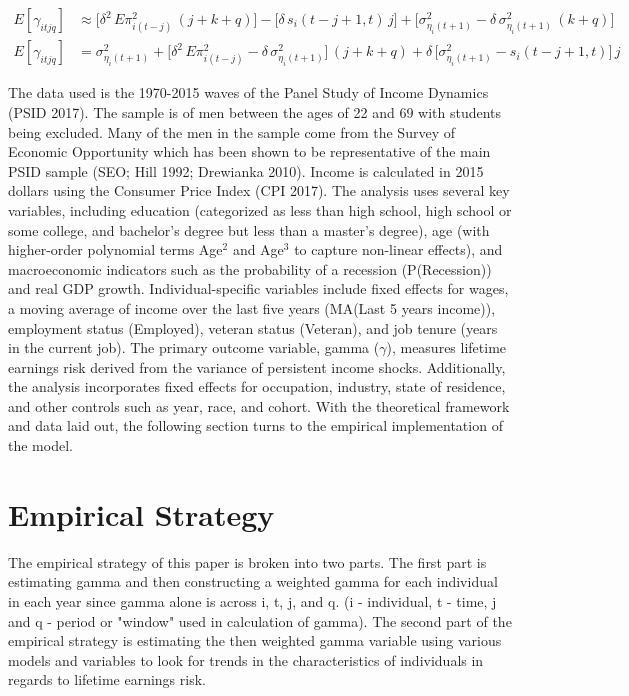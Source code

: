 \documentclass[12pt]{article}
\begin{document}
\begin{onehalfspace}
\vspace{-0.75cm}

\begin{align}
E[\gamma_{itjq}]
&\approx
\bigl[\delta^2\,E\pi^2_{i(t-j)}\,(j+k+q)\bigr]
- \bigl[\delta\,s_i(t-j+1,t)\,j\bigr]
+ \bigl[\sigma^2_{\eta_i(t+1)}
  - \delta\,\sigma^2_{\eta_i(t+1)}\,(k+q)\bigr] \\[1ex]
E[\gamma_{itjq}]
&=
\sigma^2_{\eta_i(t+1)}
+ \bigl[\delta^2\,E\pi^2_{i(t-j)} - \delta\,\sigma^2_{\eta_i(t+1)}\bigr]\,(j+k+q)
+ \delta\,\bigl[\sigma^2_{\eta_i(t+1)} - s_i(t-j+1,t)\bigr]\,j
\end{align}

The data used is the 1970-2015 waves of the Panel Study of Income Dynamics (PSID 2017). \cite{psid2017} The sample is of men between the ages of 22 and 69 with students being excluded. Many of the men in the sample come from the Survey of Economic Opportunity which has been shown to be representative of the main PSID sample (SEO; Hill 1992; Drewianka 2010). \cite{hill1992, drewianka2010} Income is calculated in 2015 dollars using the Consumer Price Index (CPI 2017). \cite{cpi2017} The analysis uses several key variables, including education (categorized as less than high school, high school or some college, and bachelor's degree but less than a master's degree), age (with higher-order polynomial terms Age$^2$ and Age$^3$ to capture non-linear effects), and macroeconomic indicators such as the probability of a recession (P(Recession)) and real GDP growth. Individual-specific variables include fixed effects for wages, a moving average of income over the last five years (MA(Last 5 years income)), employment status (Employed), veteran status (Veteran), and job tenure (years in the current job). The primary outcome variable, gamma ($\gamma$), measures lifetime earnings risk derived from the variance of persistent income shocks. Additionally, the analysis incorporates fixed effects for occupation, industry, state of residence, and other controls such as year, race, and cohort. With the theoretical framework and data laid out, the following section turns to the empirical implementation of the model.


\section{Empirical Strategy}

The empirical strategy of this paper is broken into two parts. The first part is estimating gamma and then constructing a weighted gamma for each individual in each year since gamma alone is across i, t, j, and q. (i - individual, t - time, j and q - period or "window" used in calculation of gamma). The second part of the empirical strategy is estimating the then weighted gamma variable using various models and variables to look for trends in the characteristics of individuals in regards to lifetime earnings risk.


\end{onehalfspace}
\end{document}
